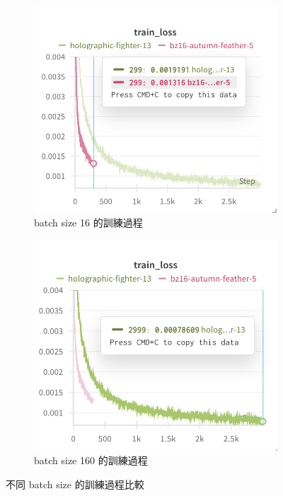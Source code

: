 \begin{figure}[H]
    \centering
    \begin{subfigure}[b]{0.48\textwidth}
        \centering
        \includegraphics[width=\textwidth]{figures/bz16vs160_1.png}
        \caption{batch size 16 的訓練過程}
        \label{fig:bz16_1}
    \end{subfigure}
    \vspace{1em}
    \begin{subfigure}[b]{0.48\textwidth}
        \centering
        \includegraphics[width=\textwidth]{figures/bz16vs160_2.png}
        \caption{batch size 160 的訓練過程}
        \label{fig:bz16_2}
    \end{subfigure}
    \caption{不同 batch size 的訓練過程比較}
    \label{fig:bz16vs160}
\end{figure}




